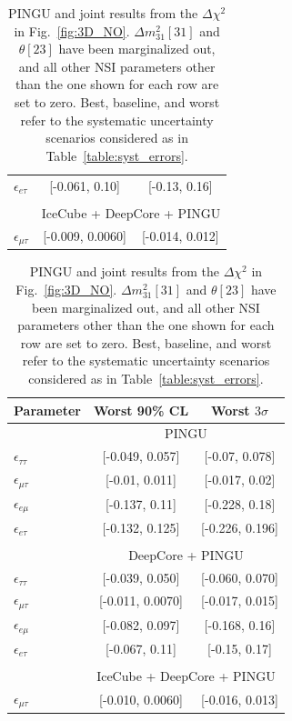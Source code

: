 \documentclass{article}
\newcommand{\emt}{\ensuremath{\epsilon_{\mu\tau}}}
\newcommand{\eet}{\epsilon_{e\tau}}
\newcommand{\eem}{\epsilon_{e\mu}}
\newcommand{\ett}{\ensuremath{\epsilon_{\tau\tau}}}
\newcommand{\dm}{\Delta m^2_{31}}
\begin{document}
{{\begin{table}
\begin{tabular}{lcc}
       $\eet$ &   [-0.061, 0.10] &  [-0.13, 0.16] \\\\
       & \multicolumn{2}{c}{IceCube + DeepCore + PINGU}  \\
       $\emt$ &  [-0.009, 0.0060] &  [-0.014, 0.012] \\
       \hline
    \end{tabular}
    \begin{tabular}{lcc}
       \hline 
       Parameter & Worst 90\% CL & Worst $3\sigma$\\
       \hline & \multicolumn{2}{c}{PINGU} \\
       $\ett$ &  [-0.049, 0.057] &   [-0.07, 0.078] \\
       $\emt$ &   [-0.01, 0.011] &   [-0.017, 0.02] \\
       $\eem$ &   [-0.137, 0.11] &   [-0.228, 0.18] \\
       $\eet$ &  [-0.132, 0.125] &  [-0.226, 0.196] \\\\
       & \multicolumn{2}{c}{DeepCore + PINGU} \\
       $\ett$ &   [-0.039, 0.050] &    [-0.060, 0.070] \\
       $\emt$ &  [-0.011, 0.0070] &  [-0.017, 0.015] \\
       $\eem$ &  [-0.082, 0.097] &  [-0.168, 0.16] \\
       $\eet$ &  [-0.067, 0.11] &  [-0.15, 0.17] \\\\
       & \multicolumn{2}{c}{IceCube + DeepCore + PINGU}  \\
       $\emt$ &   [-0.010, 0.0060] &  [-0.016, 0.013] \\
       \hline
    \end{tabular}
    \caption{PINGU and joint results from the $\Delta \chi^2$ in Fig.~\ref{fig:3D_NO}. $\dm[31]$ and $\theta[23]$ have been marginalized out, and all other NSI parameters other than the one shown for each row are set to zero.
    Best, baseline, and worst refer to 
    the systematic uncertainty scenarios considered as in Table~\ref{table:syst_errors}.}\label{table:PINGU_joint_results}
 \end{table}
 
}}
\end{document}
